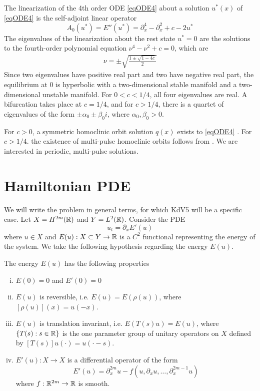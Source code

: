 \documentclass[thesis.tex]{subfiles}
\begin{document}
The linearization of the 4th order ODE \eqref{eqODE4} about a solution $u^*(x)$ of \eqref{eqODE4} is the self-adjoint linear operator
\begin{equation}\label{defA0}
A_0(u^*) = E''(u^*) = \partial_x^4 - \partial_x^2 + c - 2 u^* 
\end{equation}
The eigenvalues of the linearization about the rest state $u^* = 0$ are the solutions to the fourth-order polynomial equation $\nu^4 - \nu^2 + c = 0$, which are
\begin{align}\label{specA0}
\nu = \pm \sqrt{ \frac{1 \pm \sqrt{1 - 4c} }{2}}
\end{align}
Since two eigenvalues have positive real part and two have negative real part, the equilibrium at 0 is hyperbolic with a two-dimensional stable manifold and a two-dimensional unstable manifold. For $0 < c < 1/4$, all four eigenvalues are real. A bifurcation takes place at $c = 1/4$, and for $c > 1/4$, there is a quartet of eigenvalues of the form $\pm \alpha_0 \pm \beta_0 i$, where $\alpha_0, \beta_0 > 0$.

For $c > 0$, a symmetric homoclinic orbit solution $q(x)$ exists to \eqref{eqODE4} \cite[Theorem 2.1]{Pelinovsky2007}. For $c > 1/4$. the existence of multi-pulse homoclinic orbits follows from \cite{SandstedeStrut}. We are interested in periodic, multi-pulse solutions.

\section{Hamiltonian PDE}

We will write the problem in general terms, for which KdV5 will be a specific case. Let $X = H^{2m}({\mathbb R})$ and $Y = L^2({\mathbb R})$. Consider the PDE
\begin{equation}\label{genPDE}
u_t = \partial_x E'(u)
\end{equation}
where $u \in X$ and $E(u): X \subset Y \rightarrow {\mathbb R}$ is a $C^2$ functional representing the energy of the system. We take the following hypothesis regarding the energy $E(u)$.

\begin{hypothesis}\label{Ehyp}
The energy $E(u)$ has the following properties
\begin{enumerate}[(i)]
\item $E(0) = 0$ and $E'(0) = 0$
\item $E(u)$ is reversible, i.e. $E(u) = E(\rho(u))$, where $[\rho(u)](x) = u(-x)$.
\item $E(u)$ is translation invariant, i.e. $E(T(s)u) = E(u)$, where $\{T(s) : s \in {\mathbb R} \}$ is the one parameter group of unitary operators on $X$ defined by $[T(s)]u(\cdot) = u(\cdot - s)$.
\item $E'(u): X \rightarrow X$ is a differential operator of the form
\begin{equation}\label{Eprimeuform}
E'(u) = \partial_x^{2m}u - f(u, \partial_x u, \dots, \partial_x^{2m-1} u)
\end{equation}
where $f: {\mathbb R}^{2m} \rightarrow {\mathbb R}$ is smooth.
\end{enumerate}
\end{hypothesis}
\end{document}
